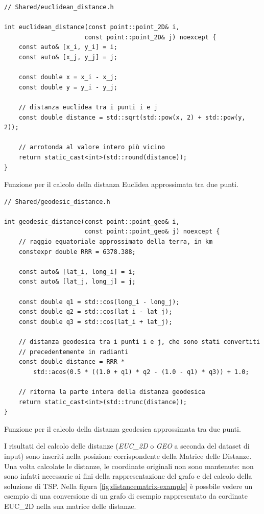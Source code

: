 \begin{listing}[!ht]
\begin{verbatim}
// Shared/euclidean_distance.h

int euclidean_distance(const point::point_2D& i,
                      const point::point_2D& j) noexcept {
    const auto& [x_i, y_i] = i;
    const auto& [x_j, y_j] = j;

    const double x = x_i - x_j;
    const double y = y_i - y_j;

    // distanza euclidea tra i punti i e j
    const double distance = std::sqrt(std::pow(x, 2) + std::pow(y, 2));
    
    // arrotonda al valore intero più vicino
    return static_cast<int>(std::round(distance));
}
\end{verbatim}
\caption{Funzione per il calcolo della distanza Euclidea approssimata tra due punti.}
\label{listing:euclidean-distance}
\end{listing}

\begin{listing}[!ht]
\begin{verbatim}
// Shared/geodesic_distance.h

int geodesic_distance(const point::point_geo& i,
                      const point::point_geo& j) noexcept {
    // raggio equatoriale approssimato della terra, in km
    constexpr double RRR = 6378.388;

    const auto& [lat_i, long_i] = i;
    const auto& [lat_j, long_j] = j;

    const double q1 = std::cos(long_i - long_j);
    const double q2 = std::cos(lat_i - lat_j);
    const double q3 = std::cos(lat_i + lat_j);

    // distanza geodesica tra i punti i e j, che sono stati convertiti
    // precedentemente in radianti
    const double distance = RRR *
        std::acos(0.5 * ((1.0 + q1) * q2 - (1.0 - q1) * q3)) + 1.0;

    // ritorna la parte intera della distanza geodesica
    return static_cast<int>(std::trunc(distance));
}
\end{verbatim}
\caption{Funzione per il calcolo della distanza geodesica approssimata tra due punti.}
\label{listing:geodesic-distance}
\end{listing}

\noindent I risultati del calcolo delle distanze (\textit{EUC\_2D} o \textit{GEO} a seconda del dataset di input) sono inseriti nella posizione corrispondente della Matrice delle Distanze.
Una volta calcolate le distanze, le coordinate originali non sono mantenute: non sono infatti necessarie ai fini della rappresentazione del grafo e del calcolo della soluzione di TSP.
Nella figura \ref{fig:distancematrix-example} è possbile vedere un esempio di una conversione di un grafo di esempio rappresentato da cordinate EUC\_2D nella sua matrice delle distanze.

